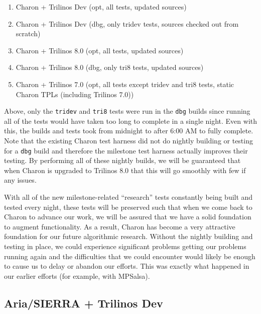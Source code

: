 \documentclass[pdf,ps2pdf,11pt]{SANDreport}
\begin{document}
\begin{enumerate}
%
{}\item Charon + Trilinos Dev (opt, all tests, updated sources)
%
{}\item Charon + Trilinos Dev (dbg, only tridev tests, sources checked out
from scratch)
%
{}\item Charon + Trilinos 8.0 (opt, all tests, updated sources)
%
{}\item Charon + Trilinos 8.0 (dbg, only tri8 tests, updated sources)
%
{}\item Charon + Trilinos 7.0 (opt, all tests except tridev and tri8 tests,
static Charon TPLs (including Trilinos 7.0))
%
\end{enumerate}

Above, only the {}\texttt{tridev} and {}\texttt{tri8} tests were run in the
{}\texttt{dbg} builds since running all of the tests would have taken too long
to complete in a single night.  Even with this, the builds and tests took from
midnight to after 6:00 AM to fully complete.  Note that the existing Charon
test harness did not do nightly building or testing for a {}\texttt{dbg} build
and therefore the milestone test harness actually improves their testing.  By
performing all of these nightly builds, we will be guaranteed that when Charon
is upgraded to Trilinos 8.0 that this will go smoothly with few if any issues.

With all of the new milestone-related ``research'' tests constantly being
built and tested every night, these tests will be preserved such that when we
come back to Charon to advance our work, we will be assured that we have a
solid foundation to augment functionality.  As a result, Charon has become a
very attractive foundation for our future algorithmic research.  Without the
nightly building and testing in place, we could experience significant
problems getting our problems running again and the difficulties that we could
encounter would likely be enough to cause us to delay or abandon our efforts.
This was exactly what happened in our earlier efforts (for example, with
MPSalsa).


%
\subsection{Aria/SIERRA + Trilinos Dev}
%
\end{document}

